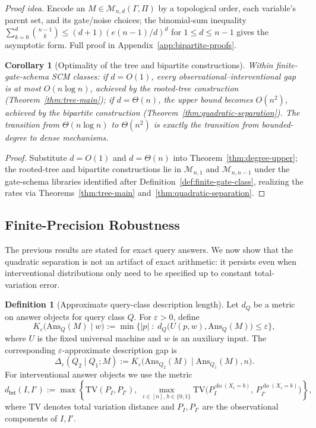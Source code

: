 \documentclass{article}
\theoremstyle{plain}
\newtheorem{corollary}[theorem]{Corollary}
\theoremstyle{definition}
\newtheorem{definition}[theorem]{Definition}
\newcommand{\calM}{\mathcal{M}}
\newcommand{\Int}{\mathsf{Int}}
\DeclareMathOperator{\doop}{do}
\newcommand{\Ans}{\mathrm{Ans}}
\begin{document}
\emph{Proof idea.} Encode an $M \in \calM_{n,d}(\Gamma,\Pi)$ by a topological order, each variable's parent set, and its gate/noise choices; the binomial-sum inequality $\sum_{k=0}^{d}\binom{n-1}{k} \leq (d+1)(e(n-1)/d)^d$ for $1 \leq d \leq n-1$ gives the asymptotic form. Full proof in Appendix~\ref{app:bipartite-proofs}.

\begin{corollary}[Optimality of the tree and bipartite constructions]
\label{cor:degree-optimality}
Within finite-gate-schema SCM classes: if $d = O(1)$, every observational--interventional gap is at most $O(n \log n)$, achieved by the rooted-tree construction (Theorem~\ref{thm:tree-main}); if $d = \Theta(n)$, the upper bound becomes $O(n^2)$, achieved by the bipartite construction (Theorem~\ref{thm:quadratic-separation}). The transition from $\Theta(n \log n)$ to $\Theta(n^2)$ is exactly the transition from bounded-degree to dense mechanisms.
\end{corollary}

\begin{proof}
Substitute $d = O(1)$ and $d = \Theta(n)$ into Theorem~\ref{thm:degree-upper}; the rooted-tree and bipartite constructions lie in $\calM_{n,1}$ and $\calM_{n,n-1}$ under the gate-schema libraries identified after Definition~\ref{def:finite-gate-class}, realizing the rates via Theorems~\ref{thm:tree-main} and~\ref{thm:quadratic-separation}.
\end{proof}

\subsection{Finite-Precision Robustness}
\label{sec:finite-precision}

The previous results are stated for exact query answers. We now show that the quadratic separation is not an artifact of exact arithmetic: it persists even when interventional distributions only need to be specified up to constant total-variation error.

\begin{definition}[Approximate query-class description length]
\label{def:approx-dl}
Let $d_Q$ be a metric on answer objects for query class $Q$. For $\varepsilon > 0$, define
\[
    K_\varepsilon\bigl(\Ans_Q(M) \mid w\bigr) := \min\bigl\{ |p| \;:\; d_Q\!\bigl(U(p, w), \Ans_Q(M)\bigr) \leq \varepsilon \bigr\},
\]
where $U$ is the fixed universal machine and $w$ is an auxiliary input. The corresponding $\varepsilon$-approximate description gap is
\[
    \Delta_\varepsilon(Q_2 \mid Q_1; M) := K_\varepsilon\bigl(\Ans_{Q_2}(M) \;\big|\; \Ans_{Q_1}(M), n\bigr).
\]
For interventional answer objects we use the metric
\[
    d_{\Int}(I, I') := \max\!\left\{ \mathrm{TV}(P_I, P_{I'}),\; \max_{i \in [n],\, b \in \{0,1\}} \mathrm{TV}\!\bigl( P^{\doop(X_i = b)}_I,\, P^{\doop(X_i = b)}_{I'} \bigr) \right\},
\]
where $\mathrm{TV}$ denotes total variation distance and $P_I, P_{I'}$ are the observational components of $I, I'$.
\end{definition}
\end{document}
